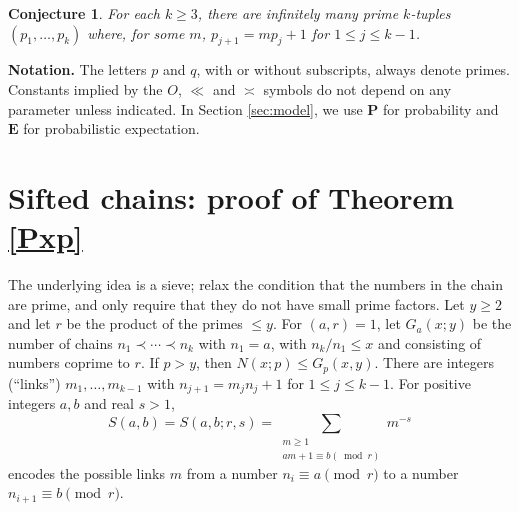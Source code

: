 \documentclass[12pt]{amsart}
\theoremstyle{remark}
\theoremstyle{plain}
\newtheorem{conj}{Conjecture}
\numberwithin{equation}{section}
\newcommand{\PPP}{\mathbf P}
\newcommand{\EEE}{\mathbf E}
\renewcommand{\(}{\left(}
\renewcommand{\)}{\right)}
\newcommand{\order}{\asymp}  %
\renewcommand{\le}{\leqslant}
\renewcommand{\ge}{\geqslant}
\begin{document}
\begin{conj}
For each $k\ge 3$, there are infinitely many prime $k$-tuples
$(p_1,\ldots, p_k)$ where, for some $m$, $p_{j+1}=m p_j + 1$ for $1\le
j\le k-1$.
\end{conj}

{\bf Notation.} 
The letters $p$ and $q$,
with or without subscripts, always denote primes.  Constants
implied by the $O$, $\ll$ and $\order$ symbols do not depend on any parameter
unless indicated.  In Section \ref{sec:model}, we use $\PPP$ for
probability and $\EEE$ for probabilistic expectation.


%
%
\section{Sifted chains: proof of Theorem \ref{Pxp}}\label{sec:Pxp}
%
%

 The underlying idea is a sieve; relax the
condition that the numbers in the chain are prime, and only
require that they do not have small prime factors. Let $y\ge 2$ and
let $r$ be the product of the primes $\le y$. For $(a,r)=1$, let
$G_a(x;y)$ be the number of chains $n_1 \prec \cdots \prec n_k$ with $n_1=a$,
 with  $n_k/n_1\le x$ and consisting of numbers coprime to $r$. 
If $p>y$, then $N(x;p) \le G_p(x,y)$.
There are integers (``links'') $m_1,
\ldots,m_{k-1}$ with $n_{j+1}=m_jn_j+1$ for $1\le j\le k-1$.
For positive integers $a,b$ and real $s>1$,
$$
S(a,b) = S(a,b;r,s) = \sum_{\substack{m\ge 1 \\ am+1\equiv b(\!\bmod{r})}}
m^{-s}
$$
encodes the possible links $m$ from
a number $n_i \equiv a\pmod{r}$ to a number $n_{i+1} \equiv b
\pmod{r}$.
\end{document}
